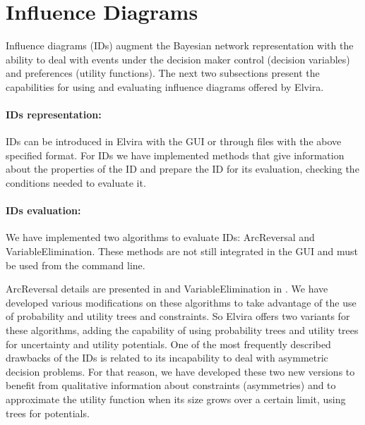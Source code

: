 \section{Influence Diagrams}

Influence diagrams (IDs) augment the 
Bayesian network representation with the ability to deal
with events under the decision maker control (decision variables)
and preferences (utility functions). The next two subsections
present the capabilities for
using and  evaluating influence diagrams offered by Elvira. 

\paragraph{IDs representation:}
IDs can be introduced in Elvira with the GUI or through files
with the above specified format. For
IDs we have implemented methods that give information about the
properties of the ID and  prepare the ID for its evaluation,
checking the conditions needed to evaluate it.


\paragraph{IDs evaluation:}
We have implemented two algorithms to evaluate IDs: ArcReversal
and VariableElimination. These methods are not still integrated
in the GUI and must be used from the command line. 

ArcReversal details are presented in \cite{sh86} and VariableElimination 
in \cite{jensen-book2001}. We have
developed various modifications on these algorithms to take advantage of
the use of probability and utility trees and constraints. So Elvira offers 
two variants for these algorithms, adding the capability of using probability 
trees and utility trees for uncertainty and utility potentials.
One of the most frequently described drawbacks of the IDs
is related to its incapability to deal with asymmetric decision problems.
For that reason, we have developed these two new versions to benefit from
qualitative information about constraints (asymmetries)
and to approximate the utility function when its size grows over a certain
limit, using trees for potentials.
